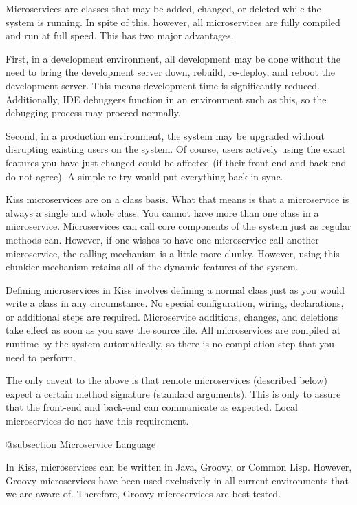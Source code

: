 Microservices are classes that may be added, changed, or deleted while
the system is running.  In spite of this, however, all microservices
are fully compiled and run at full speed.  This has two major advantages.

First, in a development environment, all development may be done without 
the need to bring the development server down, rebuild, re-deploy, and reboot
the development server.  This means development time is significantly reduced.
Additionally, IDE debuggers function in an environment such as this, so
the debugging process may proceed normally.

Second, in a production environment, the system may be upgraded
without disrupting existing users on the system.  Of course, users
actively using the exact features you have just changed could be
affected (if their front-end and back-end do not agree).
A simple re-try would put everything back in sync.

Kiss microservices are on a class basis.  What that means is that a
microservice is always a single and whole class.  You cannot have more
than one class in a microservice.  Microservices can call
core components of the system just as regular methods can.  However,
if one wishes to have one microservice call another microservice,
the calling mechanism is a little more clunky.  However, using this
clunkier mechanism retains all of the dynamic features of the system.

Defining microservices in Kiss involves defining a normal class just
as you would write a class in any circumstance.  No special
configuration, wiring, declarations, or additional steps are required.
Microservice additions, changes, and deletions take effect as soon as
you save the source file.  All microservices are compiled at runtime
by the system automatically, so there is no compilation step that
you need to perform.

The only caveat to the above is that remote microservices (described
below) expect a certain method signature (standard arguments).  This
is only to assure that the front-end and back-end can communicate as
expected.  Local microservices do not have this requirement.

@subsection Microservice Language

In Kiss, microservices can be written in Java, Groovy, or Common Lisp.
However, Groovy microservices have been used exclusively in all
current environments that we are aware of.  Therefore, Groovy
microservices are best tested.

